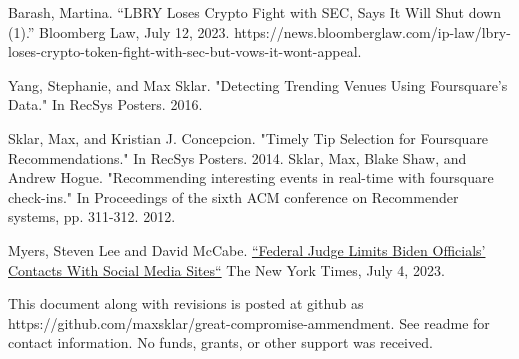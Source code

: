 \documentclass{article}
\begin{document}
\begin{thebibliography}{20}
Barash, Martina. “LBRY Loses Crypto Fight with SEC, Says It Will Shut down (1).” Bloomberg Law, July 12, 2023. https://news.bloomberglaw.com/ip-law/lbry-loses-crypto-token-fight-with-sec-but-vows-it-wont-appeal. 

Yang, Stephanie, and Max Sklar. "Detecting Trending Venues Using Foursquare's Data." In RecSys Posters. 2016.

Sklar, Max, and Kristian J. Concepcion. "Timely Tip Selection for Foursquare Recommendations." In RecSys Posters. 2014.
Sklar, Max, Blake Shaw, and Andrew Hogue. "Recommending interesting events in real-time with foursquare check-ins." In Proceedings of the sixth ACM conference on Recommender systems, pp. 311-312. 2012.

Myers, Steven Lee and David McCabe. \href{https://www.nytimes.com/2023/07/04/business/federal-judge-biden-social-media.html}{“Federal Judge Limits Biden Officials’ Contacts With Social Media Sites“}  The New York Times, July 4, 2023.

\end{thebibliography}

This document along with revisions is posted at github as https://github.com/maxsklar/great-compromise-ammendment. See readme for contact information. No funds, grants, or other support was received.
\end{document}
